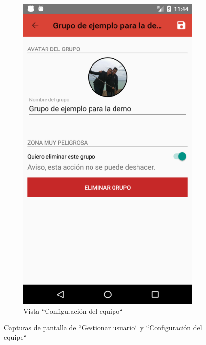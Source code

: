 \documentclass[twoside]{report}
\begin{document}
\begin{figure}[H]
\begin{center}
\begin{subfigure}[t]{.3\linewidth}
		\includegraphics[scale=0.2]{images/userguide/18.png}
		\caption{Vista “Configuración del equipo“}
	\end{subfigure}\hspace{2mm}%
\caption{Capturas de pantalla de “Gestionar usuario“ y “Configuración del equipo“}
\end{center}
\end{figure}
\end{document}
